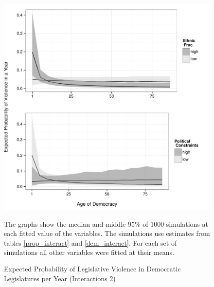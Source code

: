 \documentclass[a4paper]{article}\usepackage[]{graphicx}\usepackage[]{color}
\newenvironment{knitrout}{}{} %
\begin{document}
\begin{figure}[H]
    \begin{center}
\begin{knitrout}
\color{fgcolor}
\includegraphics[width=0.95\linewidth]{figure/predProInteract2-1} 

\end{knitrout}

    \end{center}
    \caption{Expected Probability of Legislative Violence in Democratic Legislatures per Year (Interactions 2)}
    \label{interact_plots2}
    \begin{singlespace}
      {\scriptsize{The graphs show the median and middle 95\% of 1000 simulations at each fitted value of the variables. The simulations use estimates from tables \ref{prop_interact} and \ref{dem_interact}. For each set of simulations all other variables were fitted at their means.}}
    \end{singlespace}
\end{figure}
\end{document}
